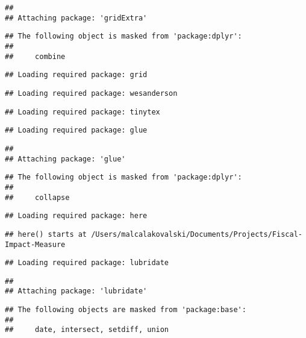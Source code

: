 \documentclass[
]{article}
\begin{document}
\begin{verbatim}
## 
## Attaching package: 'gridExtra'
\end{verbatim}

\begin{verbatim}
## The following object is masked from 'package:dplyr':
## 
##     combine
\end{verbatim}

\begin{verbatim}
## Loading required package: grid
\end{verbatim}

\begin{verbatim}
## Loading required package: wesanderson
\end{verbatim}

\begin{verbatim}
## Loading required package: tinytex
\end{verbatim}

\begin{verbatim}
## Loading required package: glue
\end{verbatim}

\begin{verbatim}
## 
## Attaching package: 'glue'
\end{verbatim}

\begin{verbatim}
## The following object is masked from 'package:dplyr':
## 
##     collapse
\end{verbatim}

\begin{verbatim}
## Loading required package: here
\end{verbatim}

\begin{verbatim}
## here() starts at /Users/malcalakovalski/Documents/Projects/Fiscal-Impact-Measure
\end{verbatim}

\begin{verbatim}
## Loading required package: lubridate
\end{verbatim}

\begin{verbatim}
## 
## Attaching package: 'lubridate'
\end{verbatim}

\begin{verbatim}
## The following objects are masked from 'package:base':
## 
##     date, intersect, setdiff, union
\end{verbatim}
\end{document}
